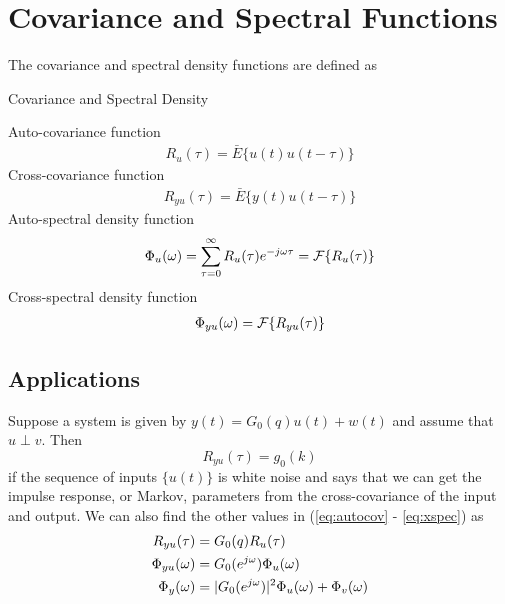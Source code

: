% 
% 
%
%
% 
\mainmatter
\setcounter{page}{1}

\lectureseries[\course]{\course}

\date{October 8, 2009}

\setaddress

\setcounter{lecture}{4}
\setcounter{chapter}{4}


\section{Covariance and Spectral Functions}
The covariance and spectral density functions are defined as
\begin{definition}{Covariance and Spectral Density}

Auto-covariance function
\begin{align}
\label{eq:autocov}
R_u(\tau) = \bar{E}\{u(t)u(t-\tau)\}
\end{align}
Cross-covariance function
\begin{align}
\label{eq:xcov}
R_{yu}(\tau) = \bar{E}\{y(t)u(t-\tau)\}
\end{align}
Auto-spectral density function
\begin{align}
\label{eq:autospec}
\Phi_u(\omega) = \sum_{\tau=0}^\infty R_u(\tau)e^{-j\omega\tau} = \mathcal{F}\{R_u(\tau)\}
\end{align}
Cross-spectral density function
\begin{align}
\label{eq:xspec}
\Phi_{yu}(\omega) = \mathcal{F}\{R_{yu}(\tau)\}
\end{align}
\end{definition}

\subsection{Applications}
Suppose a system is given by $y(t) = G_0(q)u(t)+w(t)$ and assume that $u\perp v$. Then
$$R_{yu}(\tau) = g_0(k)$$
if the sequence of inputs $\{u(t)\}$ is white noise and says that we can get the impulse response, or Markov, parameters from the cross-covariance of the input and output. We can also find the other values in (\ref{eq:autocov} - \ref{eq:xspec}) as
\begin{align*}
R_{yu}(\tau) &= G_0(q)R_u(\tau) \\
\Phi_{yu}(\omega) &= G_0(e^{j\omega})\Phi_u(\omega) \\
\Phi_y(\omega) &= |G_0(e^{j\omega})|^2\Phi_u(\omega) + \Phi_v(\omega)
\end{align*}

